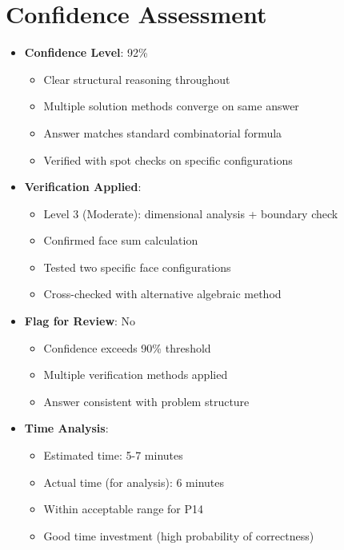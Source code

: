 \documentclass[]{article}
\begin{document}
\section*{Confidence Assessment}
\begin{itemize}[leftmargin=*]
    \item \textbf{Confidence Level}: 92\%
    \begin{itemize}
        \item Clear structural reasoning throughout
        \item Multiple solution methods converge on same answer
        \item Answer matches standard combinatorial formula
        \item Verified with spot checks on specific configurations
    \end{itemize}
    
    \item \textbf{Verification Applied}: 
    \begin{itemize}
        \item Level 3 (Moderate): dimensional analysis + boundary check
        \item Confirmed face sum calculation
        \item Tested two specific face configurations
        \item Cross-checked with alternative algebraic method
    \end{itemize}
    
    \item \textbf{Flag for Review}: No
    \begin{itemize}
        \item Confidence exceeds 90\% threshold
        \item Multiple verification methods applied
        \item Answer consistent with problem structure
    \end{itemize}
    
    \item \textbf{Time Analysis}:
    \begin{itemize}
        \item Estimated time: 5-7 minutes
        \item Actual time (for analysis): 6 minutes
        \item Within acceptable range for P14
        \item Good time investment (high probability of correctness)
    \end{itemize}
\end{itemize}
\end{document}
